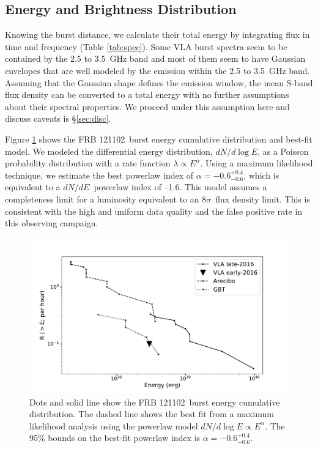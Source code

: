 \documentclass[twocolumn]{aastex61}
\newcommand{\frb}{FRB 121102}
\begin{document}
\subsection{Energy and Brightness Distribution}
\label{sec:disn}
Knowing the burst distance, we calculate their total energy by integrating flux in time and frequency (Table \ref{tab:spec}). Some VLA burst spectra seem to be contained by the 2.5 to 3.5~GHz band and most of them seem to have Gaussian envelopes that are well modeled by the emission within the 2.5 to 3.5~GHz band. Assuming that the Gaussian shape defines the emission window, the mean S-band flux density can be converted to a total energy with no further assumptions about their spectral properties. We proceed under this assumption here and discuss caveats is \S \ref{sec:disc}.

Figure \ref{fig:ed} shows the \frb\ burst energy cumulative distribution and best-fit model. We modeled the differential energy distribution, $dN/d\log{E}$, as a Poisson probability distribution with a rate function $\lambda\propto E^{\alpha}$. Using a maximum likelihood technique, we estimate the best powerlaw index of $\alpha=-0.6^{+0.4}_{-0.6}$, which is equivalent to a $dN/dE$\ powerlaw index of --1.6. This model assumes a completeness limit for a luminosity equivalent to an $8\sigma$\ flux density limit. This is consistent with the high and uniform data quality and the false positive rate in this observing campaign.

\begin{figure}[htb]
\begin{center}
\includegraphics[width=0.9\columnwidth]{energy_disn}
\caption{Dots and solid line show the  \frb\ burst energy cumulative distribution. The dashed line shows the best fit from a maximum likelihood analysis using the powerlaw model $dN/d\log{E} \propto E^{\alpha}$. The 95\% bounds on the best-fit powerlaw index is $\alpha=-0.6^{+0.4}_{-0.6}$. \label{fig:ed}}
\end{center}
\end{figure}
\end{document}
